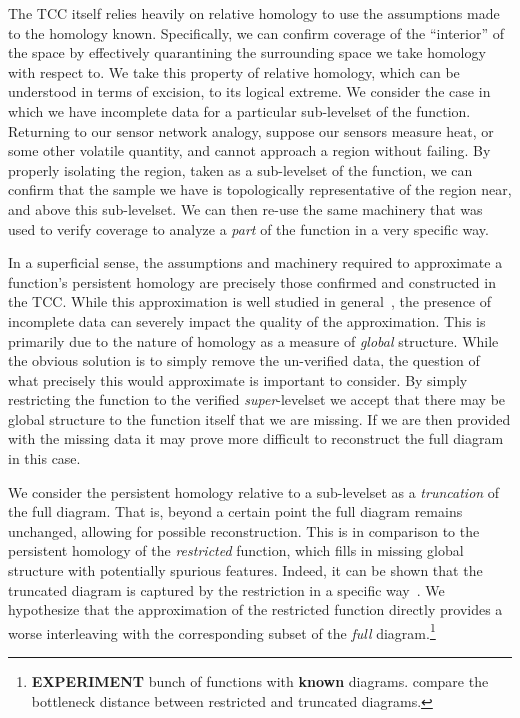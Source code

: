 The TCC itself relies heavily on relative homology to use the assumptions made to the homology known.
Specifically, we can confirm coverage of the ``interior'' of the space by effectively quarantining the surrounding space we take homology with respect to.
We take this property of relative homology, which can be understood in terms of excision, to its logical extreme.
We consider the case in which we have incomplete data for a particular sub-levelset of the function.
Returning to our sensor network analogy, suppose our sensors measure heat, or some other volatile quantity, and cannot approach a region without failing.
By properly isolating the region, taken as a sub-levelset of the function, we can confirm that the sample we have is topologically representative of the region near, and above this sub-levelset.
We can then re-use the same machinery that was used to verify coverage to analyze a \emph{part} of the function in a very specific way.

In a superficial sense, the assumptions and machinery required to approximate a function's persistent homology are precisely those confirmed and constructed in the TCC. %
While this approximation is well studied in general~\cite{chazal08towards}, the presence of incomplete data can severely impact the quality of the approximation.
This is primarily due to the nature of homology as a measure of \emph{global} structure.
While the obvious solution is to simply remove the un-verified data, the question of what precisely this would approximate is important to consider.
By simply restricting the function to the verified \emph{super}-levelset we accept that there may be global structure to the function itself that we are missing.
If we are then provided with the missing data it may prove more difficult to reconstruct the full diagram in this case.


We consider the persistent homology relative to a sub-levelset as a \emph{truncation} of the full diagram.
That is, beyond a certain point the full diagram remains unchanged, allowing for possible reconstruction.
This is in comparison to the persistent homology of the \emph{restricted} function, which fills in missing global structure with potentially spurious features.
Indeed, it can be shown that the truncated diagram is captured by the restriction in a specific way~\cite{extendedpersistence}.
We hypothesize that the approximation of the restricted function directly provides a worse interleaving with the corresponding subset of the \emph{full} diagram.\footnote{\textbf{EXPERIMENT} bunch of functions with \textbf{known} diagrams. compare the bottleneck distance between restricted and truncated diagrams.}

